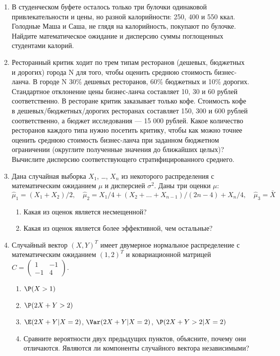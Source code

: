 \begin{enumerate}

\item В студенческом буфете осталось только три булочки одинаковой привлекательности и цены, но разной калорийности: 250, 400 и 550 ккал. Голодные Маша и Саша, не глядя на калорийность, покупают по булочке. Найдите математическое ожидание и дисперсию суммы поглощенных студентами калорий.

\item Ресторанный критик ходит по трем типам ресторанов (дешевых, бюджетных и дорогих) города N для того, чтобы оценить среднюю стоимость бизнес-ланча. В городе N 30\% дешевых ресторанов, 60\% бюджетных  и 10\% дорогих. Стандартное отклонение цены бизнес-ланча составляет 10, 30 и 60 рублей соответственно. В ресторане критик заказывает только кофе.  Стоимость кофе в дешевых/бюджетных/дорогих ресторанах составляет 150, 300 и 600 рублей соответственно, а бюджет  исследования — 15 000 рублей. Какое количество ресторанов каждого типа нужно посетить критику, чтобы как можно точнее оценить среднюю стоимость бизнес-ланча при заданном бюджетном ограничении (округлите полученные значения до ближайших целых)? Вычислите дисперсию соответствующего стратифицированного среднего.

\item Дана случайная выборка $X_1$, \ldots, $X_n$  из некоторого распределения с математическим ожиданием $\mu$ и дисперсией $\sigma^2$. Даны три оценки $\mu$:
 \[
\hat\mu_1 = (X_1 + X_2)/2, \quad \hat\mu_2 = X_1/4 + (X_2 + \ldots + X_{n-1})/(2n-4) + X_n/4, \quad \hat\mu_3 = \bar X
 \]
\begin{enumerate}
\item Какая из оценок является несмещенной?
\item Какая из оценок является более эффективной, чем остальные?
\end{enumerate}

\item Случайный вектор $(X, Y)^T$ имеет двумерное нормальное распределение с математическим ожиданием  $(1, 2)^T$ и ковариационной матрицей
$C=\begin{pmatrix}
1 & -1 \\
-1 & 4
\end{pmatrix}$.
\begin{enumerate}
\item $\P(X>1)$
\item $\P(2X+Y>2)$
\item $\E(2X+Y|X=2)$, $\Var(2X+Y|X=2)$, $\P(2X+Y>2|X=2)$
\item Сравните вероятности двух предыдущих пунктов, объясните, почему они отличаются.
Являются ли компоненты случайного вектора независимыми?
\end{enumerate}



\end{enumerate}
